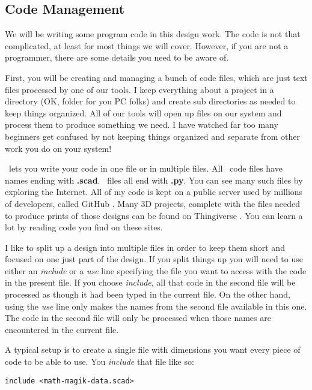 \subsection{ Code Management}

We will be writing some program code in this design work. The code is not that
complicated, at least for most things we will cover. However, if you are not a
programmer, there are some details you need to be aware of.

First, you will be creating and managing a bunch of code files, which are just
text files processed by one of our tools. I keep everything about a project in
a directory (OK, folder for you PC folks) and create sub directories as needed
to keep things organized. All of our tools will open up files on our system and
process them to produce something we need. I have watched far too many
beginners get confused by not keeping things organized and separate from other
work you do on your system!

\osc\ lets you write your code in one file or in multiple files. All \osc\ code
files have names ending with {\bf .scad}. \PY\ files all end with {\bf .py}.
You can see many such files by exploring the Internet. All of my code is kept
on a public server used by millions of developers, called GitHub \cite{blackr}.
Many 3D projects,
complete with the files needed to produce prints of those designs can be found on
Thingiverse \cite{thingy}. You can learn a lot by reading code you find on these sites.

I like to split up a design into multiple files in order to keep them short and
focused on one just part of the design. If you split things up you will need to
use either an {\it include} or a {\it use} line specifying the file you want to
access with the code in the present file. If you choose {\it include}, all that
code in the second file will be processed as though it had been typed in the
current file.  On the other hand, using the {\it use} line only makes the names
from the second file available in this one. The code in the second file will
only be processed when those names are encountered in the current file.

A typical setup is to create a single file with dimensions you want every piece
of code to be able to use. You {\it include} that file like so:

\begin{lstlisting}
include <math-magik-data.scad>
\end{lstlisting}

